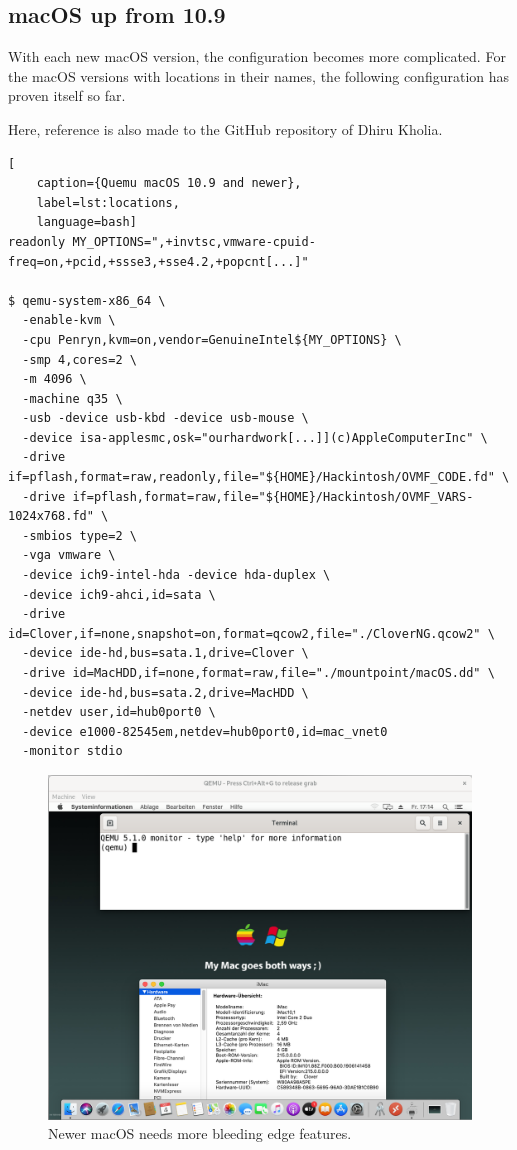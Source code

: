 \subsection{macOS up from 10.9}

With each new macOS version, the configuration becomes more complicated. For the macOS versions with locations in their names, the following configuration has proven itself so far.

Here, reference is also made to the GitHub repository of Dhiru Kholia.

\begin{lstlisting}[
    caption={Quemu macOS 10.9 and newer},
    label=lst:locations,
    language=bash]
readonly MY_OPTIONS=",+invtsc,vmware-cpuid-freq=on,+pcid,+ssse3,+sse4.2,+popcnt[...]"

$ qemu-system-x86_64 \
  -enable-kvm \
  -cpu Penryn,kvm=on,vendor=GenuineIntel${MY_OPTIONS} \
  -smp 4,cores=2 \
  -m 4096 \
  -machine q35 \
  -usb -device usb-kbd -device usb-mouse \
  -device isa-applesmc,osk="ourhardwork[...]](c)AppleComputerInc" \
  -drive if=pflash,format=raw,readonly,file="${HOME}/Hackintosh/OVMF_CODE.fd" \
  -drive if=pflash,format=raw,file="${HOME}/Hackintosh/OVMF_VARS-1024x768.fd" \
  -smbios type=2 \
  -vga vmware \
  -device ich9-intel-hda -device hda-duplex \
  -device ich9-ahci,id=sata \
  -drive id=Clover,if=none,snapshot=on,format=qcow2,file="./CloverNG.qcow2" \
  -device ide-hd,bus=sata.1,drive=Clover \
  -drive id=MacHDD,if=none,format=raw,file="./mountpoint/macOS.dd" \
  -device ide-hd,bus=sata.2,drive=MacHDD \
  -netdev user,id=hub0port0 \
  -device e1000-82545em,netdev=hub0port0,id=mac_vnet0
  -monitor stdio
\end{lstlisting}

\begin{figure}[htbp]  %
  \centering
  \includegraphics[width=.75\textwidth]{figures/boot-macos-catalina.png}
  \caption[Qemu macOS location]{Newer macOS needs more bleeding edge features.}
  \label{fig:locations}
\end{figure}

